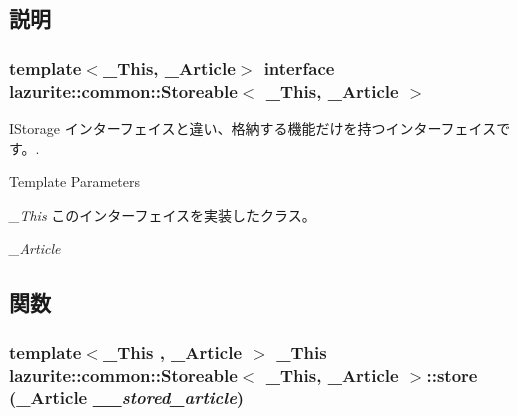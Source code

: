 \subsection{説明}
\subsubsection*{template$<$\_\-This, \_\-Article$>$ interface lazurite::common::Storeable$<$ \_\-This, \_\-Article $>$}

IStorage インターフェイスと違い、格納する機能だけを持つインターフェイスです。. 
\begin{DoxyTemplParams}{Template Parameters}
\item[{\em \_\-This}]このインターフェイスを実装したクラス。\item[{\em \_\-Article}]\end{DoxyTemplParams}


\subsection{関数}
\hypertarget{interfacelazurite_1_1common_1_1_storeable_3_01___this_00_01___article_01_4_a4bb23c87a2e80c3427a31f2d82c7b5ae}{
\subsubsection[{store}]{\setlength{\rightskip}{0pt plus 5cm}template$<$\_\-This , \_\-Article $>$ \_\-This lazurite::common::Storeable$<$ \_\-This, \_\-Article $>$::store (\_\-Article {\em \_\-\_\-stored\_\-article})}}
\label{interfacelazurite_1_1common_1_1_storeable_3_01___this_00_01___article_01_4_a4bb23c87a2e80c3427a31f2d82c7b5ae}


